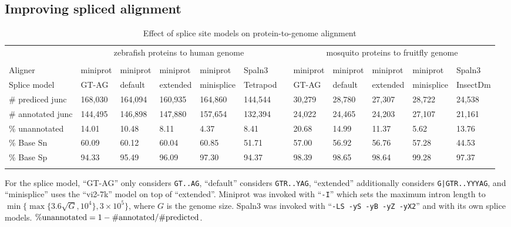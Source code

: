 \documentclass[webpdf,contemporary,large,namedate]{oup-authoring-template}%
\begin{document}
\subsection{Improving spliced alignment}

\begin{table*}[!tb]
\caption{Effect of splice site models on protein-to-genome alignment\label{tab:eval}}
\begin{tabular*}{\textwidth}{@{\extracolsep\fill}llllllclllll@{\extracolsep\fill}}
\toprule
& \multicolumn{5}{c}{zebrafish proteins to human genome} && \multicolumn{5}{c}{mosquito proteins to fruitfly genome} \\[0.4em]
\cline{2-6}\cline{8-12}\\[-0.9em]
Aligner           & miniprot  & miniprot  & miniprot  & miniprot   & Spaln3    && miniprot & miniprot & miniprot & miniprot   & Spaln3 \\
Splice model      & GT-AG     & default   & extended  & minisplice & Tetrapod  && GT-AG    & default  & extended & minisplice & InsectDm \\
\midrule
\# prediced junc  & 168,030   & 164,094   & 160,935   & 164,860    & 144,544   && 30,279   & 28,780   & 27,307   & 28,722     & 24,538 \\
\# annotated junc & 144,495   & 146,898   & 147,880   & 157,654    & 132,394   && 24,022   & 24,465   & 24,203   & 27,107     & 21,161 \\
\% unannotated    & 14.01     & 10.48     & 8.11      & 4.37       & 8.41      && 20.68    & 14.99    & 11.37    & 5.62       & 13.76 \\
\% Base Sn        & 60.09     & 60.12     & 60.04     & 60.85      & 51.71     && 57.00    & 56.92    & 56.76    & 57.28      & 44.53 \\
\% Base Sp        & 94.33     & 95.49     & 96.09     & 97.30      & 94.37     && 98.39    & 98.65    & 98.64    & 99.28      & 97.37 \\
\botrule
\end{tabular*}
\begin{tablenotes}\setlength\itemsep{0.0em}
For the splice model, ``GT-AG'' only considers {\tt GT..AG},
``default'' considers {\tt GTR..YAG},
``extended'' additionally considers {\tt G|GTR..YYYAG},
and ``minisplice'' uses the ``vi2-7k'' model on top of ``extended''.
Miniprot was invoked with ``{\tt -I}'' which sets the maximum intron length to $\min\{\max\{3.6\sqrt{G},10^4\},3\times10^5\}$, where $G$ is the genome size.
Spaln3 was invoked with ``{\tt -LS -yS -yB -yZ -yX2}'' and with its own splice models.
${\rm\%unannotated}=1-{\rm\#annotated}/{\rm\#predicted}$.
\end{tablenotes}
\end{table*}
\end{document}
